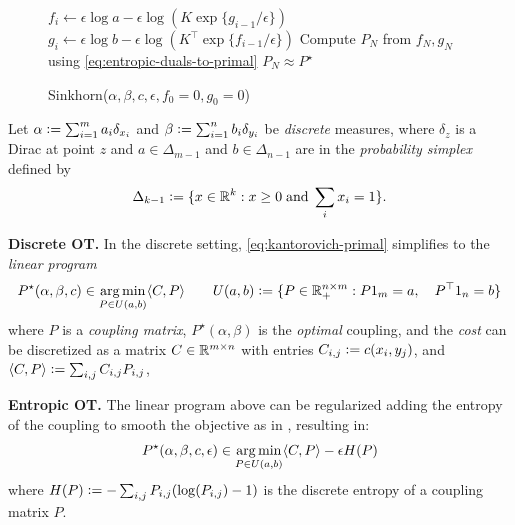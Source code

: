 \documentclass{article}
\newcommand{\defeq}{\vcentcolon=}
\begin{document}
\begin{figure}
  \vspace{-11mm}
  \begin{minipage}{0.5\textwidth}
    \begin{algorithm}[H]
      \caption{\footnotesize Sinkhorn($\alpha, \beta, c, \epsilon, f_0=0, g_0=0$)}
      \begin{algorithmic}
        \footnotesize
        \State $f_{i} \leftarrow \epsilon \log a - \epsilon\log\left(
          K \exp\{g_{i-1}/\epsilon\}\right)$
        \State $g_{i} \leftarrow \epsilon \log b - \epsilon\log\left(
          K^\top \exp\{f_{i-1}/\epsilon\}\right)$
        \EndFor
        \State Compute $P_N$ from $f_N,g_N$ using \cref{eq:entropic-duals-to-primal}
        \State\Return $P_N\approx P^\star$
      \end{algorithmic}
      \label{alg:sinkhorn}
    \end{algorithm}
  \end{minipage}
  \vspace{-6mm}
\end{figure}
Let $\alpha\defeq\sum_{i=1}^m a_i\delta_{x_i}$ and
$\beta\defeq\sum_{i=1}^n b_i\delta_{y_i}$
be
\emph{discrete} measures,
where $\delta_z$ is a Dirac at point $z$
and $a\in\Delta_{m-1}$ and $b\in\Delta_{n-1}$ are
in the \emph{probability simplex} defined by
\begin{equation}
  \label{eq:simplex}
  \Delta_{k-1}\defeq\{x\in \R^k : x\geq 0\; {\rm and}\; \sum_i x_i=1\}.
  \footnotesize
\end{equation}

\textbf{Discrete OT.}
In the discrete setting,
\cref{eq:kantorovich-primal} simplifies to the \emph{linear program}
\begin{equation}
  P^\star(\alpha,\beta,c)\in \argmin_{P\in U(a,b)} \langle C, P \rangle \qquad
  U(a, b)\defeq \{P\in\R_+^{n\times m} : P 1_m = a,\quad P^\top 1_n = b\}
  \label{eq:discrete-primal}
\end{equation}
where $P$ is a \emph{coupling matrix},
$P^\star(\alpha, \beta)$ is the \emph{optimal} coupling,
and the \emph{cost} can be discretized as a matrix $C\in\mathbb{R}^{m\times n}$ with entries
$C_{i,j}\defeq c(x_i, y_j)$, and
$\langle C, P\rangle \defeq \sum_{i,j}C_{i,j}P_{i,j}$,

\textbf{Entropic OT.}
The linear program above can be regularized adding the entropy
of the coupling to smooth the objective as in
\citet{cominetti1994asymptotic,cuturi2013sinkhorn},
resulting in:
\begin{equation}
  P^\star(\alpha,\beta,c,\epsilon)\in \operatorname*{arg\,min}_{P\in U(a,b)} \langle C, P \rangle - \epsilon H(P)
  \label{eq:entropic-primal}
\end{equation}
where $H(P)\defeq -\sum_{i,j} P_{i,j}(\log(P_{i,j})-1)$
is the discrete entropy of a coupling matrix $P$.
\end{document}
